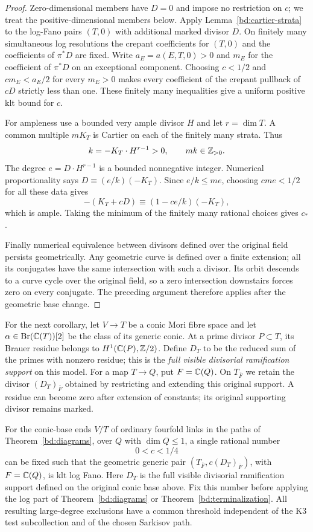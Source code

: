 \begin{proof}
Zero-dimensional members have $D=0$ and impose no restriction on $c$;
we treat the positive-dimensional members below.
Apply Lemma~\ref{bd:cartier-strata} to the log-Fano pairs
$(T,0)$ with additional marked divisor $D$.
On finitely many simultaneous log resolutions the crepant
coefficients for $(T,0)$ and the coefficients of $\pi^*D$
are fixed.  Write $a_E=a(E,T,0)>0$ and $m_E$ for the
coefficient of $\pi^*D$ on an exceptional component.
Choosing $c<1/2$ and $cm_E<a_E/2$ for every $m_E>0$
makes every coefficient of the crepant pullback of $cD$
strictly less than one.  These finitely many inequalities
give a uniform positive klt bound for $c$.

For ampleness use a bounded very ample divisor $H$ and
let $r=\dim T$.  A common multiple $mK_T$ is Cartier
on each of the finitely many strata.  Thus
\[
 k=-K_T\cdot H^{r-1}>0,\qquad mk\in\mathbb Z_{>0}.
\]
The degree $e=D\cdot H^{r-1}$ is a bounded nonnegative
integer.  Numerical proportionality says
$D\equiv(e/k)(-K_T)$.  Since $e/k\leq me$, choosing
$cme<1/2$ for all these data gives
\[
 -(K_T+cD)\equiv (1-ce/k)(-K_T),
\]
which is ample.  Taking the minimum of the finitely many
rational choices gives $c_*$.

Finally numerical equivalence between divisors defined
over the original field persists geometrically.  Any
geometric curve is defined over a finite extension; all
its conjugates have the same intersection with such a
divisor.  Its orbit descends to a curve cycle over the
original field, so a zero intersection downstairs
forces zero on every conjugate.  The preceding argument
therefore applies after the geometric base change.
\end{proof}

For the next corollary, let $V\to T$ be a conic Mori fibre space and
let $\alpha\in\operatorname{Br}(\mathbb C(T))[2]$ be the class of its generic conic.
At a prime divisor $P\subset T$, its Brauer residue belongs to
$H^1(\mathbb C(P),\mathbb Z/2)$. Define $D_T$ to be the reduced sum of the primes
with nonzero residue; this is the \emph{full visible divisorial
ramification support} on this model. For a map $T\to Q$, put
$F=\mathbb C(Q)$. On $T_{\overline F}$ we retain the divisor
$(D_T)_{\overline F}$ obtained by restricting and extending this
original support. A residue can become zero after extension of
constants; its original supporting divisor remains marked.

\begin{corollary}
\label{bd:choice-order}
For the conic-base ends $V/T$ of ordinary fourfold links in the
paths of Theorem~\ref{bd:diagrams}, over $Q$ with $\dim Q\leq1$,
a single rational number
\[
                         0<c<1/4
\]
can be fixed such that the geometric generic pair
$(T_{\overline F},c(D_T)_{\overline F})$, with $F=\mathbb C(Q)$, is klt
log Fano. Here $D_T$ is the full visible divisorial ramification
support defined on the original conic base above.
Fix this number before applying the log part of
Theorem~\ref{bd:diagrams} or
Theorem~\ref{bd:terminalization}.  All resulting
large-degree exclusions have a common threshold
independent of the K3 test subcollection and of the chosen
Sarkisov path.
\end{corollary}

